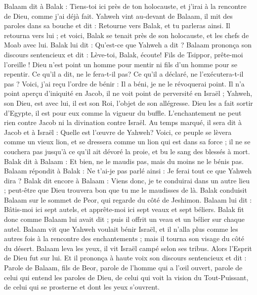 \begin{multicols}{2}
Balaam dit à Balak : Tiens-toi ici près de ton holocauste, et j’irai à la rencontre de Dieu, comme j'ai déjà fait.
Yahweh vint au-devant de Balaam, il mit des paroles dans sa bouche et dit : Retourne vers Balak, et tu parleras ainsi.
Il retourna vers lui ; et voici, Balak se tenait près de son holocauste, et les chefs de Moab avec lui. Balak lui dit : Qu'est-ce que Yahweh a dit ?
Balaam prononça son discours sentencieux et dit : Lève-toi, Balak, écoute! Fils de Tsippor, prête-moi l'oreille !
Dieu n'est point un homme pour mentir ni fils d'un homme pour se repentir. Ce qu’il a dit, ne le fera-t-il pas? Ce qu’il a déclaré, ne l’exécutera-t-il pas ?
Voici, j'ai reçu l’ordre de bénir : Il a béni, je ne le révoquerai point.
Il n'a point aperçu d'iniquité en Jacob, il ne voit point de perversité en Israël ; Yahweh, son Dieu, est avec lui, il est son Roi, l’objet de son allégresse.
Dieu les a fait sortir d'Egypte, il est pour eux comme la vigueur du buffle.
L'enchantement ne peut rien contre Jacob ni la divination contre Israël. Au temps marqué, il sera dit à Jacob et à Israël : Quelle est l’œuvre de Yahweh?
Voici, ce peuple se lèvera comme un vieux lion, et se dressera comme un lion qui est dans sa force ; il ne se couchera pas jusqu’à ce qu’il ait dévoré la proie, et bu le sang des blessés à mort.
Balak dit à Balaam : Et bien, ne le maudis pas, mais du moins ne le bénis pas.
Balaam répondit à Balak : Ne t’ai-je pas parlé ainsi : Je ferai tout ce que Yahweh dira ?
Balak dit encore à Balaam : Viens donc, je te conduirai dans un autre lieu ; peut-être que Dieu trouvera bon que tu me le maudisses de là.
Balak conduisit Balaam sur le sommet de Peor, qui regarde du côté de Jeshimon.
Balaam lui dit : Bâtis-moi ici sept autels, et apprête-moi ici sept veaux et sept béliers.
Balak fit donc comme Balaam lui avait dit ; puis il offrit un veau et un bélier sur chaque autel.
\VerseOne{}Balaam vit que Yahweh voulait bénir Israël, et il n'alla plus comme les autres fois à la rencontre des enchantements ; mais il tourna son visage du côté du désert.
Balaam leva les yeux, il vit Israël campé selon ses tribus. Alors l'Esprit de Dieu fut sur lui.
Et il prononça à haute voix son discours sentencieux et dit : Parole de Balaam, fils de Beor, parole de l'homme qui a l'œil ouvert,
parole de celui qui entend les paroles de Dieu, de celui qui voit la vision du Tout-Puissant, de celui qui se prosterne et dont les yeux s’ouvrent.

\end{multicols}

